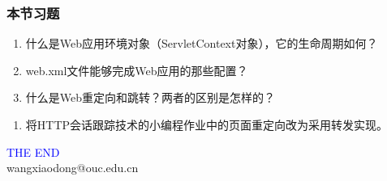 \begin{frame}
  \frametitle{本节习题}

  
  \begin{enumerate}
  \item 什么是Web应用环境对象（ServletContext对象），它的生命周期如何？
  \item web.xml文件能够完成Web应用的那些配置？
  \item 什么是Web重定向和跳转？两者的区别是怎样的？
  \end{enumerate}


  \begin{enumerate}
  \item 将HTTP会话跟踪技术的小编程作业中的页面重定向改为采用转发实现。
  \end{enumerate}
\end{frame}


\begin{frame}
\centering
{\Huge \textcolor{blue}{THE END}} \\
\vspace{5mm}
{\Large wangxiaodong@ouc.edu.cn} \\
\end{frame}

